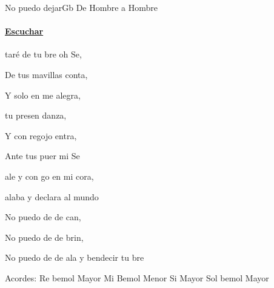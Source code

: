 \documentclass[12pt, spanish]{book}
\begin{document}
    \begin{song}{No puedo dejar}{Gb}
    {} %
    {De Hombre a Hombre}
    {} %
    {} %
        \ifChordBk
        \paragraph{\mbox{}\hfill\protect\href{https://open.spotify.com/intl-es/track/0ReDbT2imJ0o1EJLswTlIV}{Escuchar}\mbox{}\hfill}
        \fi


        \begin{SBOpGroup}
            taré de tu bre oh Se,

            De tus mavillas conta,

            Y solo en  me alegra,


             tu presen danza,

            Y con regojo entra,

            Ante tus puer mi Se
        \end{SBOpGroup}
        \vskip 20pt
        \begin{SBOpGroup}
             ale y con go en mi cora,


             alaba y declara al mundo 
        \end{SBOpGroup}

        \begin{SBChorus}
            No puedo de de can,

            No puedo de de brin,

            No puedo de de ala y bendecir tu bre
        \end{SBChorus}

        \ifChordBk
        \begin{SBOpGroup}
            Acordes:\break
            \upchord{\Dflat}\qquad Re bemol Mayor  \hfill
            \upchord{\Eflatm}Mi Bemol Menor \hfill\null\break
            \upchord{\B}\qquad\qquad Si Mayor \hfill
            \upchord{\Gflat}\qquad Sol bemol Mayor \hfill\null\break
        \end{SBOpGroup}
        \fi


\end{song}
\end{document}

